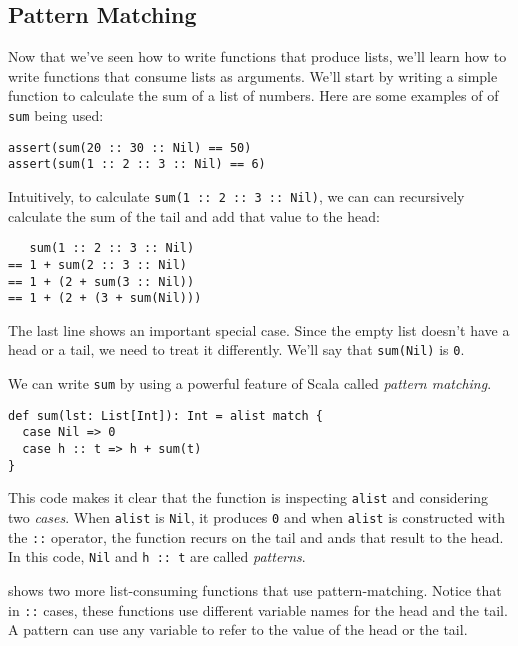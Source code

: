 \documentclass[9pt]{extbook}
\begin{document}
\subsection{Pattern Matching}

Now that we've seen how to write functions that produce lists, we'll
learn how to write functions that consume lists as arguments. We'll
start by writing a simple function to calculate the sum of a list of numbers.
Here are some examples of of \lstinline|sum| being used:
%
\begin{lstlisting}
assert(sum(20 :: 30 :: Nil) == 50)
assert(sum(1 :: 2 :: 3 :: Nil) == 6)
\end{lstlisting}

Intuitively, to calculate \lstinline|sum(1 :: 2 :: 3 :: Nil)|, we can
can recursively calculate the sum of the tail and add that value to the
head:
\begin{lstlisting}
   sum(1 :: 2 :: 3 :: Nil)
== 1 + sum(2 :: 3 :: Nil)
== 1 + (2 + sum(3 :: Nil))
== 1 + (2 + (3 + sum(Nil)))
\end{lstlisting}
%
The last line shows an important special case. Since the empty list
doesn't have a head or a tail, we need to treat it differently. We'll say
that \lstinline|sum(Nil)| is \lstinline|0|.

We can write \lstinline|sum| by using a powerful feature of
Scala called \emph{pattern matching}.
%
\begin{lstlisting}
def sum(lst: List[Int]): Int = alist match {
  case Nil => 0
  case h :: t => h + sum(t)
}
\end{lstlisting}
%
This code makes it clear that the function is inspecting \lstinline|alist|
and considering two \emph{cases}. When \lstinline|alist| is \lstinline|Nil|,
it produces \lstinline|0| and when \lstinline{alist} is constructed with
the \lstinline|::| operator, the function recurs on the tail and ands
that result to the head. In this code,
\lstinline|Nil| and \lstinline|h :: t| are called \emph{patterns}.

 shows two more list-consuming functions that
use pattern-matching. Notice that in \lstinline|::| cases, these functions
use different variable names for the head and the tail. A pattern can use
any variable to refer to the value of the head or the tail.
\end{document}
